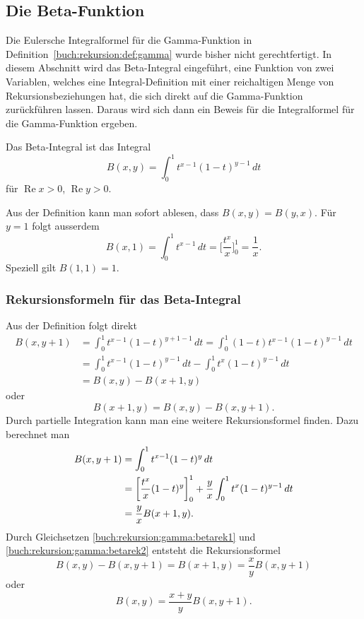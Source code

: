 %
%
%
\subsection{Die Beta-Funktion
\label{buch:rekursion:gamma:subsection:beta}}
Die Eulersche Integralformel für die Gamma-Funktion in
Definition~\ref{buch:rekursion:def:gamma} wurde bisher nicht
gerechtfertigt.
In diesem Abschnitt wird das Beta-Integral eingeführt, eine Funktion
von zwei Variablen, welches eine Integral-Definition mit einer
reichaltigen Menge von Rekursionsbeziehungen hat, die sich direkt auf
die Gamma-Funktion zurückführen lassen.
Daraus wird sich dann ein Beweis für die Integralformel für die
Gamma-Funktion ergeben.

\begin{definition}
\label{buch:rekursion:gamma:def:beta-funktion}
Das Beta-Integral ist das Integral
\[
B(x,y)
=
\int_0^1 t^{x-1} (1-t)^{y-1}\,dt
\]
für $\operatorname{Re}x>0$, $\operatorname{Re}y>0$.
\end{definition}

Aus der Definition kann man sofort ablesen, dass $B(x,y)=B(y,x)$.
Für $y=1$ folgt ausserdem
\begin{equation}
B(x,1)
=
\int_0^1 t^{x-1}\,dt
=
\biggl[ \frac{t^x}{x}\biggr]_0^1
=
\frac{1}{x}.
\label{buch:rekursion:gamma:betax1}
\end{equation}
Speziell gilt $B(1,1)=1$.

\subsubsection{Rekursionsformeln für das Beta-Integral}
Aus der Definition folgt direkt
\begin{align*}
B(x,y+1)
&=
\int_0^1 t^{x-1} (1-t)^{y+1-1}\,dt
=
\int_0^1 (1-t) t^{x-1} (1-t)^{y-1}\,dt
\\
&=
\int_0^1 t^{x-1} (1-t)^{y-1}\,dt
-
\int_0^1 t^{x} (1-t)^{y-1}\,dt
\\
&=
B(x,y) - B(x+1,y)
\end{align*}
oder
\begin{equation}
B(x+1,y) = B(x,y) - B(x,y+1).
\label{buch:rekursion:gamma:betarek1}
\end{equation}
%
%
Durch partielle Integration kann man eine weitere Rekursionsformel finden.
Dazu berechnet man
\begin{align}
B(x,y+1)
&=
\int_0^1 t^{x-1}(1-t)^{y}\,dt
\notag
\\
&=
\biggl[\frac{t^x}x(1-t)^y\biggr]_0^1
+
\frac{y}x \int_0^1 t^x(1-t)^{y-1}\,dt
\notag
\\
&=
 \frac{y}x B(x+1,y).
\label{buch:rekursion:gamma:betarek2}
\end{align}
Durch Gleichsetzen
\eqref{buch:rekursion:gamma:betarek1}
und
\eqref{buch:rekursion:gamma:betarek2}
entsteht die Rekursionsformel
\[
B(x,y)-B(x,y+1)
=
B(x+1,y)
=
\frac{x}{y}B(x,y+1)
\]
oder
\begin{equation}
B(x,y)
=
\frac{x+y}{y}B(x,y+1).
\label{buch:rekursion:gamma:betarek3}
\end{equation}

